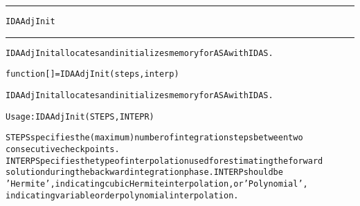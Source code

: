 \begin{samepage}
\hrule
\begin{center}
{\large \verb!IDAAdjInit!}
\label{p:IDAAdjInit}
\end{center}
\hrule\vspace{0.1in}



\begin{alltt}
IDAAdjInit allocates and initializes memory for ASA with IDAS.
\end{alltt}

\end{samepage}



\begin{samepage}


\begin{alltt}
function [] = IDAAdjInit(steps, interp) 
\end{alltt}

\end{samepage}



\begin{alltt}
IDAAdjInit allocates and initializes memory for ASA with IDAS.

   Usage: IDAAdjInit(STEPS, INTEPR) 

   STEPS    specifies the (maximum) number of integration steps between two 
            consecutive check points.
   INTERP   Specifies the type of interpolation used for estimating the forward 
            solution during the backward integration phase. INTERP should be
            'Hermite', indicating cubic Hermite interpolation, or 'Polynomial',
            indicating variable order polynomial interpolation.
\end{alltt}






\vspace{0.1in}